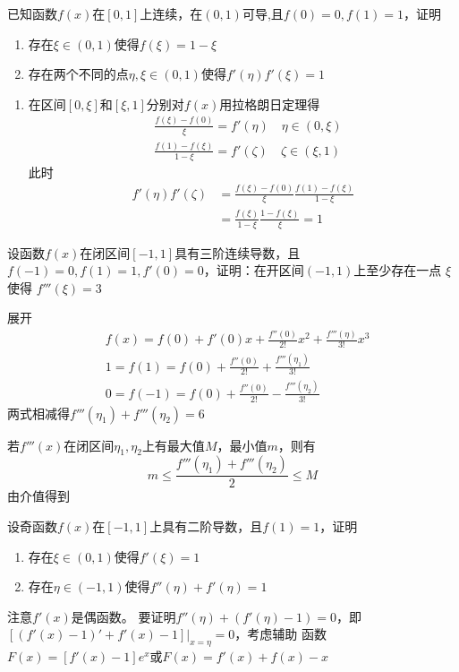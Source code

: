 \documentclass{article}
\begin{document}
\begin{examplle}[]
已知函数\(f(x)\)在\([0,1]\)上连续，在\((0,1)\)可导,且\(f(0)=0,f(1)=1\)，证明
\begin{enumerate}
\item 存在\(\xi\in(0,1)\)使得\(f(\xi)=1-\xi\)
\item 存在两个不同的点\(\eta,\xi\in(0,1)\)使得\(f'(\eta)f'(\xi)=1\)
\end{enumerate}


\begin{enumerate}
\item 在区间\([0,\xi]\)和\([\xi,1]\)分别对\(f(x)\)用拉格朗日定理得
\begin{align*}
&\frac{f(\xi)-f(0)}{\xi}=f'(\eta)\quad\eta\in(0,\xi)\\
&\frac{f(1)-f(\xi)}{1-\xi}=f'(\zeta)\quad\zeta\in(\xi,1)
\end{align*}
此时
\begin{align*}
f'(\eta)f'(\zeta)&=\frac{f(\xi)-f(0)}{\xi}\frac{f(1)-f(\xi)}{1-\xi}\\
&=\frac{f(\xi)}{1-\xi}\frac{1-f(\xi)}{\xi}=1
\end{align*}
\end{enumerate}
\end{examplle}

\begin{examplle}[]
设函数\(f(x)\)在闭区间\([-1,1]\)具有三阶连续导数，且
\(f(-1)=0,f(1)=1,f'(0)=0\)，证明：在开区间\((-1,1)\)上至少存在一点 \(\xi\) 使得
\(f'''(\xi)=3\)


展开
\begin{align*}
&f(x)=f(0)+f'(0)x+\frac{f''(0)}{2!}x^2+\frac{f'''(\eta)}{3!}x^3\\
&1=f(1)=f(0)+\frac{f''(0)}{2!}+\frac{f'''(\eta_1)}{3!}\\
&0=f(-1)=f(0)+\frac{f''(0)}{2!}-\frac{f'''(\eta_2)}{3!}
\end{align*}
两式相减得\(f'''(\eta_1)+f'''(\eta_2)=6\)

若\(f'''(x)\)在闭区间\(\eta_1,\eta_2\)上有最大值\(M\)，最小值\(m\)，则有
\begin{equation*}
m\le\frac{f'''(\eta_1)+f'''(\eta_2)}{2}\le M
\end{equation*}
由介值得到
\end{examplle}


\begin{examplle}[]
设奇函数\(f(x)\)在\([-1,1]\)上具有二阶导数，且\(f(1)=1\)，证明
\begin{enumerate}
\item 存在\(\xi\in(0,1)\)使得\(f'(\xi)=1\)
\item 存在\(\eta\in(-1,1)\)使得\(f''(\eta)+f'(\eta)=1\)
\end{enumerate}


注意\(f'(x)\)是偶函数。
要证明\(f''(\eta)+(f'(\eta)-1)=0\)，即\([(f'(x)-1)'+f'(x)-1]|_{x=\eta}=0\)，考虑辅助
函数
\(F(x)=[f'(x)-1]e^x\)或\(F(x)=f'(x)+f(x)-x\)
\end{examplle}
\end{document}
